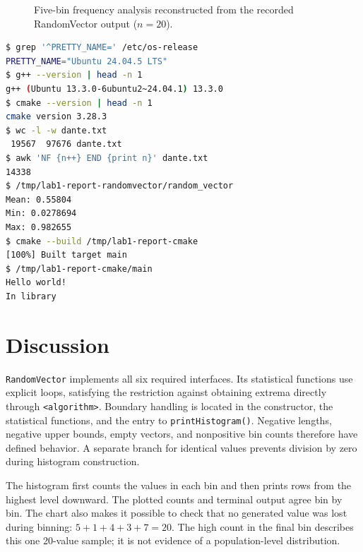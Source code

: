 \documentclass[letterpaper,10pt,conference]{ieeeconf}
\begin{document}
\begin{figure}[t]
\centering
{}
\caption{Five-bin frequency analysis reconstructed from the recorded RandomVector output ($n=20$).}
\label{fig:histogram}
\end{figure}

\noindent\begin{minipage}{\columnwidth}
\begin{lstlisting}[language=bash,basicstyle=\ttfamily\tiny]
$ grep '^PRETTY_NAME=' /etc/os-release
PRETTY_NAME="Ubuntu 24.04.5 LTS"
$ g++ --version | head -n 1
g++ (Ubuntu 13.3.0-6ubuntu2~24.04.1) 13.3.0
$ cmake --version | head -n 1
cmake version 3.28.3
$ wc -l -w dante.txt
 19567  97676 dante.txt
$ awk 'NF {n++} END {print n}' dante.txt
14338
$ /tmp/lab1-report-randomvector/random_vector
Mean: 0.55804
Min: 0.0278694
Max: 0.982655
$ cmake --build /tmp/lab1-report-cmake
[100%] Built target main
$ /tmp/lab1-report-cmake/main
Hello world!
In library
\end{lstlisting}
\end{minipage}

\section{Discussion}

\texttt{RandomVector} implements all six required interfaces. Its statistical functions use explicit loops, satisfying the restriction against obtaining extrema directly through \texttt{<algorithm>}. Boundary handling is located in the constructor, the statistical functions, and the entry to \texttt{printHistogram()}. Negative lengths, negative upper bounds, empty vectors, and nonpositive bin counts therefore have defined behavior. A separate branch for identical values prevents division by zero during histogram construction.

The histogram first counts the values in each bin and then prints rows from the highest level downward. The plotted counts and terminal output agree bin by bin. The chart also makes it possible to check that no generated value was lost during binning: $5+1+4+3+7=20$. The high count in the final bin describes this one 20-value sample; it is not evidence of a population-level distribution.
\end{document}
